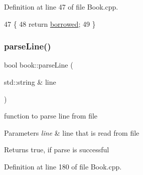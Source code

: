 Definition at line 47 of file Book.\+cpp.


\begin{DoxyCode}
47                             \{
48     \textcolor{keywordflow}{return} \hyperlink{classbook_ab745520ed537e69bde6f2e3d7a103276}{borrowed};
49 \}
\end{DoxyCode}
\mbox{\label{classbook_acf51be6cb1a1e98d461144e134583c8f}} 
\subsubsection{\texorpdfstring{parse\+Line()}{parseLine()}}
{\footnotesize\ttfamily bool book\+::parse\+Line (\begin{DoxyParamCaption}\item[{std\+::string \&}]{line }\end{DoxyParamCaption})}

function to parse line from file 
\begin{DoxyParams}{Parameters}
{\em line} & line that is read from file \\
\hline
\end{DoxyParams}
\begin{DoxyReturn}{Returns}
true, if parse is successful 
\end{DoxyReturn}


Definition at line 180 of file Book.\+cpp.


